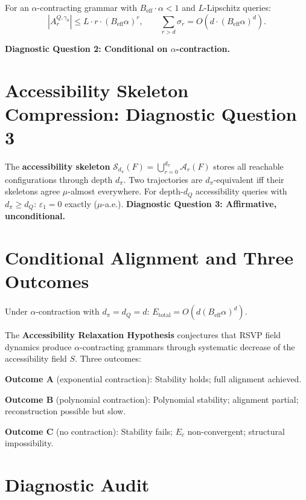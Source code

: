 \begin{theorem}
\label{thm:accessibility-stability}
For an $\alpha$-contracting grammar with $B_{\mathrm{eff}} \cdot \alpha < 1$ and $L$-Lipschitz queries:
\[
  |A_r^{Q,\gamma_0}| \leq L \cdot r \cdot (B_{\mathrm{eff}}\alpha)^r, \qquad \sum_{r>d} \sigma_r = O(d \cdot (B_{\mathrm{eff}}\alpha)^d).
\]
\end{theorem}

\textbf{Diagnostic Question 2: Conditional on $\alpha$-contraction.}

\section{Accessibility Skeleton Compression: Diagnostic Question 3}

The \textbf{accessibility skeleton} $\mathcal{S}_{d_\pi}(F) = \bigcup_{r=0}^{d_\pi} \mathcal{A}_r(F)$ stores all reachable configurations through depth $d_\pi$. Two trajectories are $d_\pi$-equivalent iff their skeletons agree $\mu$-almost everywhere. For depth-$d_Q$ accessibility queries with $d_\pi \geq d_Q$: $\varepsilon_1 = 0$ exactly ($\mu$-a.e.). \textbf{Diagnostic Question 3: Affirmative, unconditional.}

\section{Conditional Alignment and Three Outcomes}

Under $\alpha$-contraction with $d_\pi = d_Q = d$: $E_{\mathrm{total}} = O(d(B_{\mathrm{eff}}\alpha)^d)$.

The \textbf{Accessibility Relaxation Hypothesis} conjectures that RSVP field dynamics produce $\alpha$-contracting grammars through systematic decrease of the accessibility field $S$. Three outcomes:

\textbf{Outcome A} (exponential contraction): Stability holds; full alignment achieved.

\textbf{Outcome B} (polynomial contraction): Polynomial stability; alignment partial; reconstruction possible but slow.

\textbf{Outcome C} (no contraction): Stability fails; $E_c$ non-convergent; structural impossibility.

\section{Diagnostic Audit}

